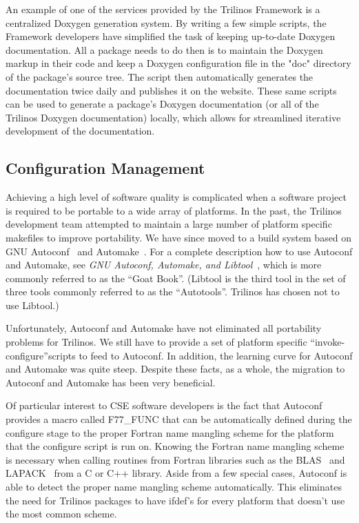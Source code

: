 \documentclass[12pt,relax]{article}
\begin{document}
An example of one of the services provided by the Trilinos Framework is a
centralized Doxygen generation system.  By writing a few simple scripts, 
the Framework developers have simplified the task of keeping up-to-date
Doxygen documentation.  All a package needs to do then is to maintain the 
Doxygen markup in their code and keep a Doxygen configuration file in the
"doc" directory of the package's source tree.  The script then automatically
generates the documentation twice daily and publishes it on the website.  These
same scripts can be used to generate a package's Doxygen documentation (or all
of the Trilinos Doxygen documentation) locally, which allows for streamlined
iterative development of the documentation.

\subsection{Configuration Management}

Achieving a high level of software quality is complicated when 
a software project is required to be portable to a wide array of platforms.
In the past, the Trilinos development team attempted to maintain a large 
number of platform specific makefiles to improve portability.  We have since 
moved to a build system based on  GNU Autoconf~\cite{Autoconf} and 
Automake~\cite{Automake}. 
For a complete description how to use Autoconf and Automake, see 
{\it GNU Autoconf, Automake, and Libtool}~\cite{GoatBook}, which is 
more commonly referred to as the ``Goat Book''.  (Libtool is the third tool 
in the set of three tools commonly referred to as the ``Autotools''.  Trilinos 
has chosen not to use Libtool.)

Unfortunately, Autoconf and Automake have not eliminated all portability 
problems for Trilinos.  We still have to provide a set of platform specific
``invoke-configure''scripts to feed to Autoconf.  In addition, the learning 
curve for Autoconf and Automake was quite steep.  Despite these facts, 
as a whole, the migration to Autoconf and Automake has been very 
beneficial.  

Of particular interest to CSE software developers is the fact that Autoconf 
provides a macro called F77\_FUNC that can be 
automatically defined during the configure stage to the proper Fortran
name mangling scheme for the platform that the configure script is run on.  
Knowing the Fortran name mangling scheme is necessary when calling routines 
from Fortran libraries such as the BLAS~\cite{BLAS1,BLAS2,BLAS3} and 
LAPACK~\cite{lapack} from a C or C++ library.  Aside from a few special cases, 
Autoconf is able to detect the proper name mangling scheme automatically.  
This eliminates the need for Trilinos packages to have ifdef's for every 
platform that doesn't use the most common scheme.
\end{document}
